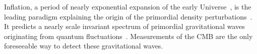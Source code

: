 \documentclass[PICOReport.tex]{subfiles}
\begin{document}

Inflation, a period of nearly exponential expansion of the early Universe~\cite{Guth:1980zm,Linde:1981mu,Albrecht:1982wi,Starobinsky:1980te}, is the leading paradigm explaining the origin of the primordial density perturbations~\cite{Mukhanov:1981xt,Guth:1982ec,Hawking:1982cz,Starobinsky:1982ee,Bardeen:1983qw}. It predicts a nearly scale invariant spectrum of primordial gravitational waves originating from quantum fluctuations~\cite{Starobinsky:1979ty}. 
Measurements of the \ac{CMB} are the only foreseeable way to detect these gravitational waves.

\end{document}
